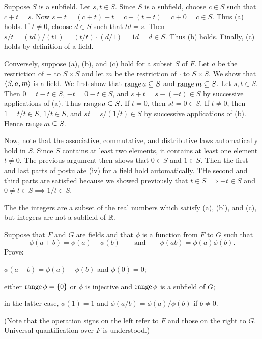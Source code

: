 \begin{solution}
Suppose $S$ is a subfield. Let $s,t\in S$.
Since $S$ is a subfield, choose $c\in S$ such that $c+t=s$.
Now $s-t=(c+t)-t=c+(t-t)=c+0=c\in S$. Thus (a) holds.
If $t\neq 0$, choose $d\in S$ such that $td=s$.
Then $s/t=(td)/(t1)=(t/t)\cdot(d/1)=1d=d\in S$. Thus (b) holds.
Finally, (c) holds by definition of a field.

Conversely, suppose (a), (b), and (c) hold for a subset $S$ of $F$.
Let $a$ be the restriction of $+$ to $S\times S$ and let $m$ be the restriction of $\cdot$ to $S\times S$.
We show that $\left\langle S,a,m\right\rangle$ is a field.
We first show that $\operatorname{range} a\subseteq S$ and $\operatorname{range} m\subseteq S$. Let $s,t\in S$.
Then $0=t-t\in S$, $-t=0-t\in S$, and $s+t=s-(-t)\in S$ by successive applications of (a).
Thus $\operatorname{range} a\subseteq S$. If $t=0$, then $st=0\in S$. If $t\neq 0$, then $1=t/t\in S$, $1/t\in S$,
and $st=s/(1/t)\in S$ by successive applications of (b). Hence $\operatorname{range} m\subseteq S$.

Now, note that the associative, commutative, and distributive laws automatically hold in $S$.
Since $S$ contains at least two elements, it contains at least one element $t\neq 0$.
The previous argument then shows that $0\in S$ and $1\in S$. Then the first and
last parts of postulate (iv) for a field hold automatically.
THe second and third parts are satisfied because we showed previously that $t\in S\implies -t\in S$
and $0\neq t\in S\implies 1/t\in S$.

The the integers are a subset of the real numbers which satisfy (a), (b'), and (c), but integers
are not a subfield of $\mathbb{R}$.
\end{solution}

\begin{exercise}
Suppose that $F$ and $G$ are fields and that $\phi$ is a function from $F$ to $G$ such that
\[\phi(a+b)=\phi(a)+\phi(b) \qquad \text{and} \qquad \phi(ab)=\phi(a)\phi(b).\]
Prove:
\begin{enumalpha}
    \item $\phi(a-b)=\phi(a)-\phi(b)$ and $\phi(0)=0$;
    \item either $\operatorname{range} \phi=\left\{0\right\}$ or $\phi$ is injective and $\operatorname{range}\phi$ is a subfield of $G$;
    \item in the latter case, $\phi(1)=1$ and $\phi(a/b)=\phi(a)/\phi(b)$ if $b\neq 0$.
\end{enumalpha}
(Note that the operation signs on the left refer to $F$ and those on the right to $G$. Universal
quantification over $F$ is understood.)
\end{exercise}

